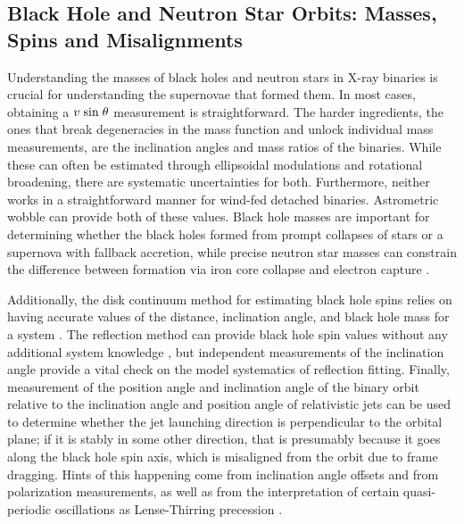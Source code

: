 \documentclass{article}
\begin{document}
\subsection{Black Hole and Neutron Star Orbits: Masses, Spins and Misalignments} 
\label{sec:BH_NS_orbit}

Understanding the masses of black holes and neutron stars in X-ray binaries is crucial for understanding the supernovae that formed them.  In most cases, obtaining a $v\;{\rm sin}\; \theta$ measurement is straightforward.  The harder ingredients, the ones that break degeneracies in the mass function and unlock individual mass measurements, are the inclination angles and mass ratios of the binaries.  While these can often be estimated through ellipsoidal modulations and rotational broadening, there are systematic uncertainties for both.  Furthermore, neither works in a straightforward manner for wind-fed detached binaries.  Astrometric wobble can provide both of these values.  Black hole masses are important for determining whether the black holes formed from prompt collapses of stars or a supernova with fallback accretion, while precise neutron star masses can constrain the difference between formation via iron core collapse and electron capture \cite{2004ApJ...612.1044P, 2017ApJ...846..170T}.

Additionally, the disk continuum method for estimating black hole spins relies on having accurate values of the distance, inclination angle, and black hole mass for a system \cite{2014SSRv..183..295M, 2014ApJ...790...29G}.  The reflection method can provide black hole spin values without any additional system knowledge \cite{2014SSRv..183..277R, 2023ApJ...946...19D}, but independent measurements of the inclination angle provide a vital check on the model systematics of reflection fitting. Finally, measurement of the position angle and inclination angle of the binary orbit relative to the inclination angle and position angle of relativistic jets can be used to determine whether the jet launching direction is perpendicular to the orbital plane; if it is stably in some other direction, that is presumably because it goes along the black hole spin axis, which is misaligned from the orbit due to frame dragging.  Hints of this happening come from inclination angle offsets \cite{2001ApJ...553..955F,2002MNRAS.336.1371M} and from polarization measurements\cite{2022Sci...375..874P}, as well as from the interpretation of certain quasi-periodic oscillations as Lense-Thirring precession \cite{2001ApJ...553..955F}.
\end{document}
